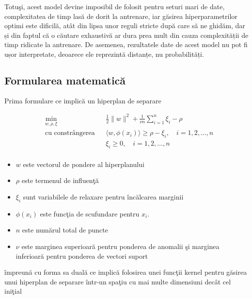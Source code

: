 Totuşi, acest model devine imposibil de folosit pentru 
seturi mari de date, complexitatea de timp lasă de dorit 
la antrenare, iar găsirea hiperparametrilor optimi este 
dificilă, atât din lipsa unor reguli stricte după care 
să ne ghidăm, dar și din faptul că o căutare exhaustivă 
ar dura prea mult din cauza complexității de timp ridicate 
la antrenare. De asemenea, rezultatele date de acest model 
nu pot fi ușor interpretate, deoarece ele reprezintă distanțe,
nu probabilități.

\subsection{Formularea matematică}

Prima formulare ce implică un hiperplan de separare

\begin{equation}
    \begin{aligned}
    & \underset{w, \rho, \xi}{\text{min}}
    & & \frac{1}{2} \|w\|^2 + \frac{1}{\nu n} \sum_{i=1}^{n} \xi_i - \rho \\
    & \text{cu constrângerea}
    & & \langle w, \phi(x_i) \rangle \geq \rho - \xi_i, \quad i=1,2,\ldots,n \\
    &&& \xi_i \geq 0, \quad i=1,2,\ldots,n \\
    \end{aligned}
    \end{equation}
    
    \begin{itemize}
        \item $w$ este vectorul de pondere al hiperplanului
        \item $\rho$ este termenul de influenţă
        \item $\xi_i$ sunt variabilele de relaxare pentru încălcarea marginii
        \item $\phi(x_i)$ este funcţia de scufundare pentru $x_i$.
        \item $n$ este numărul total de puncte
        \item $\nu$ este marginea superioară pentru ponderea de anomalii şi marginea 
        inferioară pentru ponderea de vectori suport
    
    \end{itemize}


    împreună cu forma sa duală ce implică folosirea unei funcţii kernel pentru găsirea unui hiperplan 
    de separare într-un spaţiu cu mai multe dimensiuni decât cel iniţial


